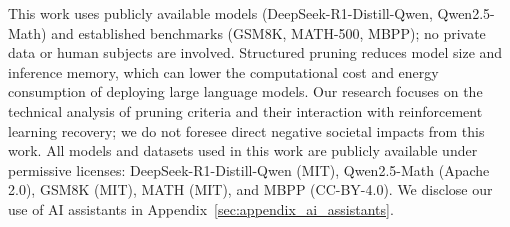 This work uses publicly available models (DeepSeek-R1-Distill-Qwen, Qwen2.5-Math) and established benchmarks (GSM8K, MATH-500, MBPP); no private data or human subjects are involved.
Structured pruning reduces model size and inference memory, which can lower the computational cost and energy consumption of deploying large language models.
Our research focuses on the technical analysis of pruning criteria and their interaction with reinforcement learning recovery; we do not foresee direct negative societal impacts from this work.
All models and datasets used in this work are publicly available under permissive licenses: DeepSeek-R1-Distill-Qwen (MIT), Qwen2.5-Math (Apache 2.0), GSM8K (MIT), MATH (MIT), and MBPP (CC-BY-4.0).
We disclose our use of AI assistants in Appendix~\ref{sec:appendix_ai_assistants}.
